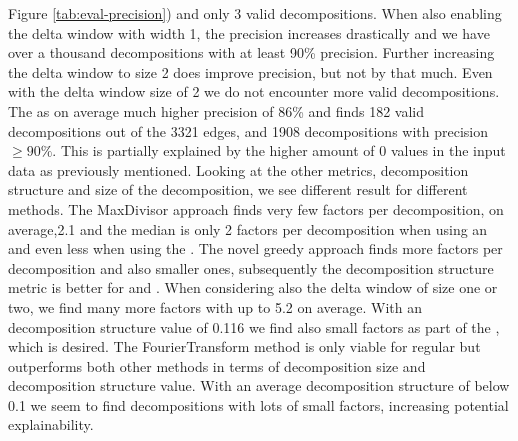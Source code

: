 Figure \ref{tab:eval-precision}) and only 3 valid decompositions.
When also enabling the delta window with width 1, the precision increases drastically and we have over a thousand decompositions with at least 90\% precision. 
Further increasing the delta window to size 2 does improve precision, but not by that much.
Even with the delta window size of 2 we do not encounter more valid decompositions.
The \andDecomp as on average much higher precision of 86\% and finds 182 valid decompositions out of the 3321 edges, and 1908 decompositions with precision $\geq 90\%$.
This is partially explained by the higher amount of 0 values in the input data as previously mentioned.
Looking at the other metrics, decomposition structure and size of the decomposition, we see different result for different methods.
The MaxDivisor approach finds very few factors per decomposition, on average,2.1 and the median is only 2 factors per decomposition when using an \andDecomp and even less when using the \orDecomp.
The novel greedy approach finds more factors per decomposition and also smaller ones, subsequently the decomposition structure metric is better for \andDecomp and \orDecomp.
When considering also the delta window of size one or two, we find many more factors with up to 5.2 on average.
With an decomposition structure value of 0.116 we find also small factors as part of the \orDecomp, which is desired.
The FourierTransform method is only viable for regular \orDecomp but outperforms both other methods in terms of decomposition size and decomposition structure value.
With an average decomposition structure of below 0.1 we seem to find decompositions with lots of small factors, increasing potential explainability.



